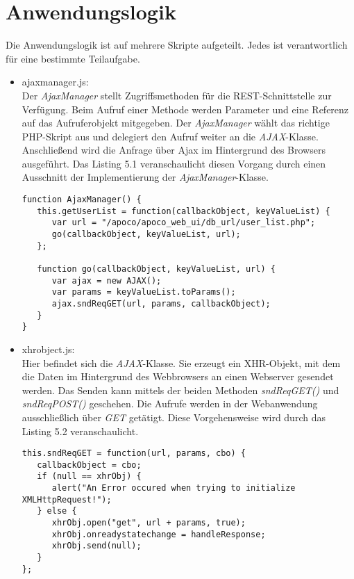  

 
 \section{Anwendungslogik}

Die Anwendungslogik ist auf mehrere Skripte aufgeteilt.
Jedes ist verantwortlich f\"ur eine bestimmte Teilaufgabe.
\begin{itemize}
 \item ajaxmanager.js:\\
 Der \emph{AjaxManager} stellt Zugriffsmethoden f\"ur die REST-Schnittstelle zur Verf\"ugung.
 Beim Aufruf einer Methode werden Parameter und eine Referenz auf das Aufruferobjekt mitgegeben.
 Der \emph{AjaxManager} w\"ahlt das richtige PHP-Skript aus und delegiert den Aufruf weiter an 
 die \emph{AJAX}-Klasse.
 Anschlie\ss{}end wird die Anfrage \"uber Ajax im Hintergrund des Browsers ausgef\"uhrt.
 Das Listing 5.1 veranschaulicht diesen Vorgang durch einen Ausschnitt der Implementierung der \emph{AjaxManager}-Klasse.\\
 
 \begin{lstlisting}[caption={Beispiel f\"ur \emph{AjaxManager}-Implementierung}]
function AjaxManager() {
   this.getUserList = function(callbackObject, keyValueList) {
      var url = "/apoco/apoco_web_ui/db_url/user_list.php";
      go(callbackObject, keyValueList, url);
   };
   
   function go(callbackObject, keyValueList, url) {
      var ajax = new AJAX();
      var params = keyValueList.toParams();
      ajax.sndReqGET(url, params, callbackObject);
   }
}
\end{lstlisting}
 
 \item xhrobject.js:\\
 Hier befindet sich die \emph{AJAX}-Klasse.
 Sie erzeugt ein XHR-Objekt, mit dem die Daten im Hintergrund des Webbrowsers an einen Webserver gesendet werden.
 Das Senden kann mittels der beiden Methoden \emph{sndReqGET()} und \emph{sndReqPOST()} geschehen.
 Die Aufrufe werden in der Webanwendung ausschlie\ss{}lich \"uber \emph{GET} get\"atigt.
 Diese Vorgehensweise wird durch das Listing 5.2 veranschaulicht.\\
 
 \begin{lstlisting}[caption={Beispiel f\"ur eine Methode zum Senden \"uber Ajax}]
this.sndReqGET = function(url, params, cbo) {        
   callbackObject = cbo;
   if (null == xhrObj) {
      alert("An Error occured when trying to initialize XMLHttpRequest!");
   } else {
      xhrObj.open("get", url + params, true);
      xhrObj.onreadystatechange = handleResponse;
      xhrObj.send(null);
   }               
};
\end{lstlisting}


\end{itemize}
